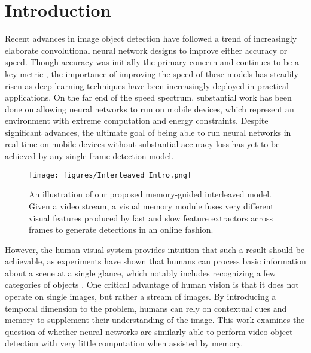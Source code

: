 \documentclass[10pt,twocolumn,letterpaper]{article}
\begin{document}
\section{Introduction}
Recent advances in image object detection have followed a trend of increasingly elaborate convolutional neural network \cite{Krizhevsky, Simonyan1, Szegedy1, he2016deep} designs to improve either accuracy or speed. Though accuracy was initially the primary concern and continues to be a key metric \cite{Girshick, Hek3, RenS, liu2016ssd, DaiJ, lin2017feature, lin2017focal}, the importance of improving the speed of these models has steadily risen as deep learning techniques have been increasingly deployed in practical applications. On the far end of the speed spectrum, substantial work \cite{Howard, sandler2018mobilenetv2, ZhangX, ma2018shufflenet, WuJ, jacob2018quantization, zhu2018towardsmobile} has been done on allowing neural networks to run on mobile devices, which represent an environment with extreme computation and energy constraints. Despite significant advances, the ultimate goal of being able to run neural networks in real-time on mobile devices without substantial accuracy loss has yet to be achieved by any single-frame detection model.

\begin{figure}[t!]
\begin{center}
   \texttt{[image: figures/Interleaved\_Intro.png]}
\end{center}
\vspace{-1em}
   \caption{An illustration of our proposed memory-guided interleaved model. Given a video stream, a visual memory module fuses very different visual features produced by fast and slow feature extractors across frames to generate detections in an online fashion.}
\label{fig:key_fig}
\end{figure}

However, the human visual system provides intuition that such a result should be achievable, as experiments have shown that humans can process basic information about a scene at a single glance, which notably includes recognizing a few categories of objects \cite{oliva2005gist}. One critical advantage of human vision is that it does not operate on single images, but rather a stream of images. By introducing a temporal dimension to the problem, humans can rely on contextual cues and memory to supplement their understanding of the image. This work examines the question of whether neural networks are similarly able to perform video object detection with very little computation when assisted by memory.
\end{document}
